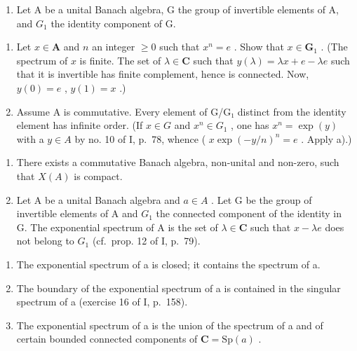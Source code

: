 \begin{enumerate}
\def\labelenumi{\arabic{enumi})}
\setcounter{enumi}{2}
\tightlist
\item
  Let A be a unital Banach algebra, G the group of invertible elements of A, and \(G_{1}\) the identity component of G.
\end{enumerate}

\begin{enumerate}
\def\labelenumi{\alph{enumi})}
\item
  Let \(x \in \mathbf{A}\) and \(n\) an integer \(\geqslant 0\) such that \(x^n = e\) . Show that \(x \in \mathbf{G}_1\) . (The spectrum of \(x\) is finite. The set of \(\lambda \in \mathbf{C}\) such that \(y(\lambda) = \lambda x + e - \lambda e\) such that it is invertible has finite complement, hence is connected. Now, \(y(0) = e\) , \(y(1) = x\) .)
\item
  Assume A is commutative. Every element of G/G₁ distinct from the identity element has infinite order. (If \(x \in G\) and \(x^n \in G_1\) , one has \(x^n = \exp(y)\) with a \(y \in A\) by no. 10 of I, p.~78, whence ( \(x \exp(-y/n)^n = e\) . Apply a).)
\end{enumerate}

\begin{enumerate}
\def\labelenumi{\arabic{enumi})}
\setcounter{enumi}{3}
\item
  There exists a commutative Banach algebra, non-unital and non-zero, such that \(X(A)\) is compact.
\item
  Let A be a unital Banach algebra and \(a \in A\) . Let G be the group of invertible elements of A and \(G_1\) the connected component of the identity in G. The exponential spectrum of A is the set of \(\lambda \in \mathbf{C}\) such that \(x - \lambda e\) does not belong to \(G_1\) (cf.~prop. 12 of I, p.~79).
\end{enumerate}

\begin{enumerate}
\def\labelenumi{\alph{enumi})}
\item
  The exponential spectrum of a is closed; it contains the spectrum of a.
\item
  The boundary of the exponential spectrum of a is contained in the singular spectrum of a (exercise 16 of I, p.~158).
\item
  The exponential spectrum of a is the union of the spectrum of a and of certain bounded connected components of \(\mathbf{C}=\mathrm{Sp}(a)\) .
\end{enumerate}

